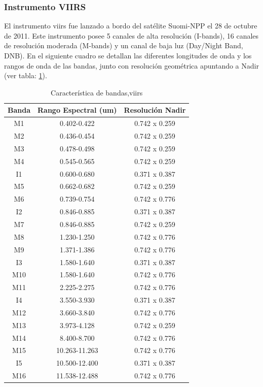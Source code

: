 \subsubsection{Instrumento VIIRS}\label{sub:viirs}
El instrumento \ac{viirs} fue lanzado a bordo del satélite Suomi-NPP el 28 de octubre de 2011. Este instrumento posee 5 canales de alta resolución (I-bands), 16 canales de resolución moderada (M-bands) y un canal de baja luz (Day/Night Band, DNB).  En el siguiente cuadro se detallan las diferentes longitudes de onda y los rangos de onda de las bandas, junto con resolución geométrica apuntando a Nadir (ver tabla: \ref{tab:viirs}).
\begin{table}[H]
\begin{center}
\begin{tabular}{|c|c|c|}
\hline Banda & Rango Espectral (um) & Resolución Nadir \\\hline 
 		M1  & 0.402-0.422   & 0.742 x 0.259 \\ \hline 
		M2  & 0.436-0.454   & 0.742 x 0.259 \\ \hline 
		M3  & 0.478-0.498   & 0.742 x 0.259 \\ \hline 
		M4  & 0.545-0.565   & 0.742 x 0.259 \\ \hline 
		I1  & 0.600-0.680   & 0.371 x 0.387 \\ \hline 
		M5  & 0.662-0.682   & 0.742 x 0.259 \\ \hline 
		M6  & 0.739-0.754   & 0.742 x 0.776 \\ \hline 
		I2  & 0.846-0.885   & 0.371 x 0.387 \\ \hline 
		M7  & 0.846-0.885   & 0.742 x 0.259 \\ \hline 
		M8  & 1.230-1.250   & 0.742 x 0.776 \\ \hline 
		M9  & 1.371-1.386   & 0.742 x 0.776 \\ \hline 
		I3  & 1.580-1.640   & 0.371 x 0.387 \\ \hline 
		M10 & 1.580-1.640   & 0.742 x 0.776 \\ \hline 
		M11 & 2.225-2.275   & 0.742 x 0.776 \\ \hline 
		I4  & 3.550-3.930   & 0.371 x 0.387 \\ \hline 
		M12 & 3.660-3.840   & 0.742 x 0.776 \\ \hline 
		M13 & 3.973-4.128   & 0.742 x 0.259 \\ \hline 
		M14 & 8.400-8.700   & 0.742 x 0.776 \\ \hline 
		M15 & 10.263-11.263 & 0.742 x 0.776 \\ \hline 
		I5  & 10.500-12.400 & 0.371 x 0.387 \\ \hline 
		M16 & 11.538-12.488 & 0.742 x 0.776 \\ \hline 
\end{tabular}
\end{center}\caption{Característica de bandas,\ac{viirs} \label{tab:viirs}}
\end{table}

